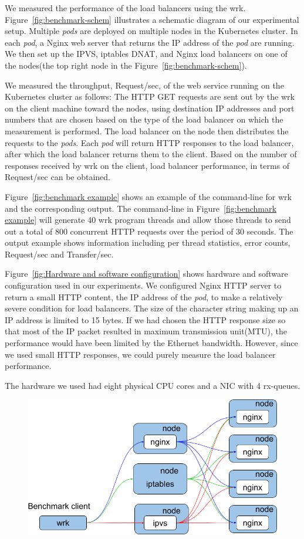 We measured the performance of the load balancers using the wrk.
Figure~\ref{fig:benchmark-schem} illustrates a schematic diagram of our experimental setup.
Multiple {\em pods} are deployed on multiple nodes in the Kubernetes cluster. 
In each {\em pod}, a Nginx web server that returns the IP address of the {\em pod} are running.
We then set up the IPVS, iptables DNAT, and Nginx load balancers on one of the nodes(the top right node in the Figure~\ref{fig:benchmark-schem}). 

We measured the throughput, Request/sec, of the web service running on the Kubernetes cluster as follows:
The HTTP GET requests are sent out by the wrk on the client machine toward the nodes,
using destination IP addresses and port numbers that are chosen based on the type of the load balancer on which the measurement is performed.
The load balancer on the node then distributes the requests to the {\em pods}.
Each {\em pod} will return HTTP responses to the load balancer, after which the load balancer returns them to the client.
Based on the number of responses received by wrk on the client, 
load balancer performance, in terms of Request/sec can be obtained. 

Figure~\ref{fig:benchmark example} shows an example of the command-line for wrk and the corresponding output.
The command-line in Figure~\ref{fig:benchmark example} will generate 40 wrk program threads 
and allow those threads to send out a total of 800 concurrent HTTP requests over the period of 30 seconds.
The output example shows information including per thread statistics, error counts, Request/sec and Transfer/sec.

Figure~\ref{fig:Hardware and software configuration} shows hardware and software configuration used in our experiments.
We configured Nginx HTTP server to return a small HTTP content, 
the IP address of the {\em pod}, to make a relatively severe condition for load balancers. 
The size of the character string making up an IP address is limited to 15 bytes.
If we had chosen the HTTP response size so that most of the IP packet resulted in maximum transmission unit(MTU), 
the performance would have been limited by the Ethernet bandwidth.
However, since we used small HTTP responses, we could purely measure the load balancer performance.

The hardware we used had eight physical CPU cores and a NIC with 4 rx-queues.


\begin{figure}[t]
  \centering
  \includegraphics[width=0.7\columnwidth]{Figs/lb_single_schem}
  \caption{}
  \label{fig:lb_single_schem}
\end{figure}

